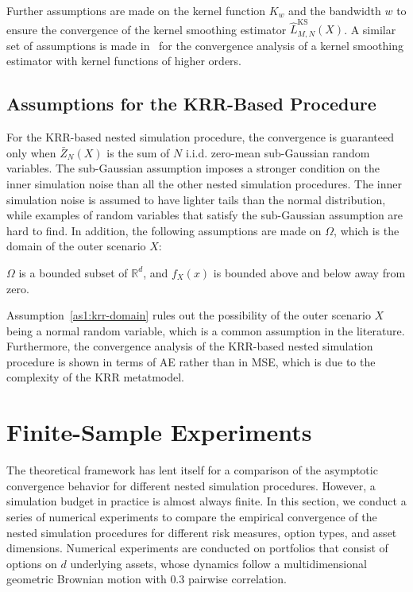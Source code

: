 Further assumptions are made on the kernel function $K_w$ and the bandwidth $w$ to ensure the convergence of the kernel smoothing estimator $\hat{L}^{\text{KS}}_{M, N}(X)$.
A similar set of assumptions is made in~\cite{jennen1988unifying} for the convergence analysis of a kernel smoothing estimator with kernel functions of higher orders.

\subsection{Assumptions for the KRR-Based Procedure}
For the KRR-based nested simulation procedure, the convergence is guaranteed only when $\bar{Z}_N(X)$ is the sum of $N$ i.i.d. zero-mean sub-Gaussian random variables.
The sub-Gaussian assumption imposes a stronger condition on the inner simulation noise than all the other nested simulation procedures.
The inner simulation noise is assumed to have lighter tails than the normal distribution, while examples of random variables that satisfy the sub-Gaussian assumption are hard to find.
In addition, the following assumptions are made on $\Omega$, which is the domain of the outer scenario $X$:

\begin{assumption} \label{as1:krr-domain}
    $\Omega$ is a bounded subset of $\mathbb{R}^d$, and $f_X(x)$ is bounded above and below away from zero.
\end{assumption}

Assumption~\ref{as1:krr-domain} rules out the possibility of the outer scenario $X$ being a normal random variable, which is a common assumption in the literature.
Furthermore, the convergence analysis of the KRR-based nested simulation procedure is shown in terms of AE rather than in MSE, which is due to the complexity of the KRR metatmodel.

\section{Finite-Sample Experiments} \label{sec1:numerical-experiments}
The theoretical framework has lent itself for a comparison of the asymptotic convergence behavior for different nested simulation procedures.
However, a simulation budget in practice is almost always finite.
In this section, we conduct a series of numerical experiments to compare the empirical convergence of the nested simulation procedures for different risk measures, option types, and asset dimensions.
Numerical experiments are conducted on portfolios that consist of options on $d$ underlying assets, whose dynamics follow a multidimensional geometric Brownian motion with $0.3$ pairwise correlation.

